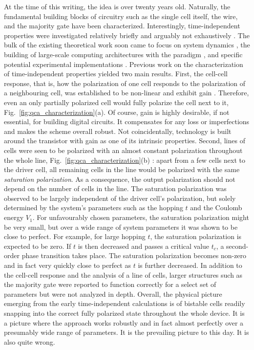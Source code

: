 At the time of this writing, the  idea is over twenty years old.
Naturally, the fundamental building blocks of  circuitry such as the
single cell itself, the wire, and the majority gate have been characterized.
Interestingly, time-independent properties were investigated relatively briefly
and arguably not exhaustively \cite{lent1993quantum, lent1993lines,
tougaw1993bistable, lent1993bistable}. The bulk of the existing theoretical work
soon came to focus on system dynamics \cite{tougaw1996dynamic, toth2001role},
the building of large-scale computing architectures with the  paradigm
\cite{tougaw1994logical, lent1997device, hennessy2001clocking}, and specific
potential experimental implementations \cite{orlov1999experimental,
amlani1999digital, kummamuru2003operation, gardelis2003evidence,
mitic2006demonstration, haider2009controlled}. Previous work on the
characterization of time-independent  properties yielded two main
results. First, the cell-cell response, that is, how the polarization of one
cell responds to the polarization of a neighbouring cell, was established to be
non-linear and exhibit gain \cite{lent1993quantum}. Therefore, even an only
partially polarized cell would fully polarize the cell next to it,
Fig.~\ref{fig:qca_characterization}(a). Of course, gain is highly desirable, if
not essential, for building digital circuits. It compensates for any loss or
imperfections and makes the scheme overall robust. Not coincidentally,
 technology is built around the  transistor with gain as
one of its intrinsic properties. Second, lines of cells were seen to be
polarized with an almost constant polarization throughout the whole line,
Fig.~\ref{fig:qca_characterization}(b) \cite{lent1993lines}: apart from a few
cells next to the driver cell, all remaining cells in the line would be
polarized with the same \emph{saturation polarization}. As a consequence, the
output polarization should not depend on the number of cells in the line. The
saturation polarization was observed to be largely independent of the driver
cell's polarization, but solely determined by the system's parameters such as
the hopping $t$ and the Coulomb energy $V_1$. For unfavourably chosen
parameters, the saturation polarization might be very small, but over a wide
range of system parameters it was shown to be close to perfect. For example, for
large hopping $t$, the saturation polarization is expected to be zero. If $t$ is
then decreased and passes a critical value $t_c$, a second-order phase
transition takes place. The saturation polarization becomes non-zero and in fact
very quickly close to perfect as $t$ is further decreased. In addition to the
cell-cell response and the analysis of a line of cells, larger 
structures such as the majority gate were reported to function correctly for a
select set of parameters but were not analyzed in depth.  Overall, the physical
picture emerging from the early time-independent calculations is of bistable
cells readily snapping into the correct fully polarized state throughout the
whole device. It is a picture where the  approach works robustly and
in fact almost perfectly over a presumably wide range of parameters. It is the
prevailing picture to this day.  It is also quite wrong.

